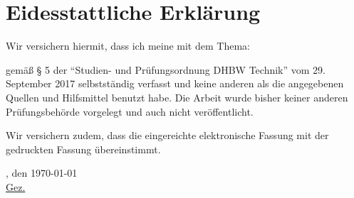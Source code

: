 
\chapter*{Eidesstattliche Erklärung}
Wir versichern hiermit, dass ich meine \arbeit{} mit dem Thema:
\begin{quote}
	\textit{\thetitle}
\end{quote} 
gemäß § 5 der \enquote{Studien- und Prüfungsordnung DHBW Technik} vom 29. September 2017 selbstständig verfasst und keine anderen als die angegebenen Quellen und Hilfsmittel benutzt habe. Die Arbeit wurde bisher keiner anderen Prüfungsbehörde vorgelegt und auch nicht veröffentlicht.

\vspace{0.25cm}

Wir versichern zudem, dass die eingereichte elektronische Fassung mit der gedruckten Fassung übereinstimmt.

\vspace{1cm}

\verfassungsort, den \today \\[0.5cm]
	{\underline{Gez. \theauthor}}
	{\makebox[6cm]{\hrulefill}}\\ 
\theauthor
